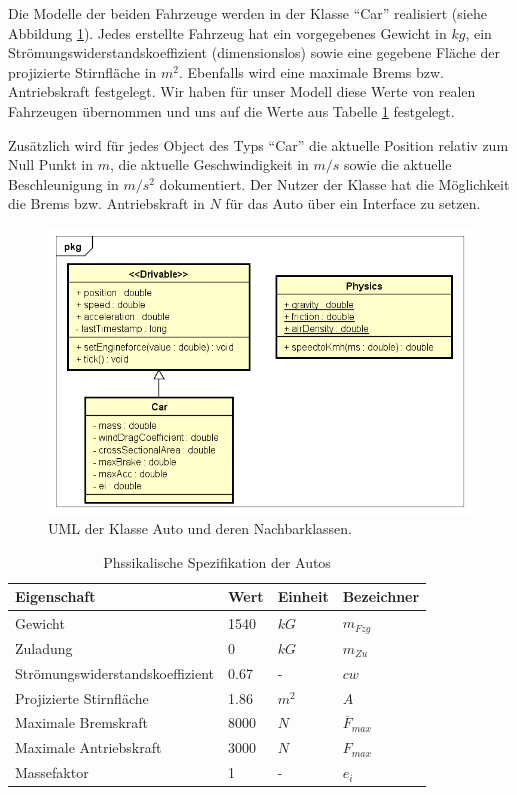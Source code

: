 \documentclass[12pt,a4paper,bibliography=totocnumbered,listof=totocnumbered, abstracton]{scrartcl}
\theoremstyle{Umgebung}
\begin{document}
Die Modelle der beiden Fahrzeuge werden in der Klasse \enquote{Car} realisiert (siehe Abbildung \ref{fig:car}). Jedes erstellte Fahrzeug hat ein vorgegebenes Gewicht in $kg$, ein Strömungswiderstandskoeffizient (dimensionslos) sowie eine gegebene Fläche der projizierte Stirnfläche in $m^2$. Ebenfalls wird eine maximale Brems bzw. Antriebskraft festgelegt. Wir haben für unser Modell diese Werte von realen Fahrzeugen übernommen und uns auf die Werte aus Tabelle \ref{table:car} festgelegt.

Zusätzlich wird für jedes Object des Typs \enquote{Car} die aktuelle Position relativ zum Null Punkt in $m$, die aktuelle Geschwindigkeit in $m/s$ sowie  die aktuelle Beschleunigung in $m/s^2$ dokumentiert. Der Nutzer der Klasse hat die Möglichkeit die Brems bzw. Antriebskraft in $N$ für das Auto über ein Interface zu setzen.

\begin{figure}
	\centering
	\includegraphics[width=0.7\linewidth]{img/practical/car-diagram}
	\caption{UML der Klasse Auto und deren Nachbarklassen.}
	\label{fig:car}
\end{figure}

\begin{table}[]
	\centering
	\caption{Phssikalische Spezifikation der Autos}
	\label{table:car}
	\begin{tabular}{@{}llll@{}}
		\toprule
		Eigenschaft                     & Wert & Einheit & Bezeichner           \\ \midrule
		Gewicht                         & 1540 & $kG$    & $m_{Fzg}$            \\
		Zuladung                        & 0    & $kG$    & $m_{Zu}$             \\
		Strömungswiderstandskoeffizient & 0.67 & -       & $cw$                 \\
		Projizierte Stirnfläche         & 1.86 & $m^2$   & $A$                  \\
		Maximale Bremskraft             & 8000 & $N$     & $\overline{F}_{max}$ \\
		Maximale Antriebskraft          & 3000 & $N$     & $ {F}_{max} $        \\
		Massefaktor                     & 1    & -       & $ {e}_{i} $          \\ \bottomrule
	\end{tabular}
\end{table}
\end{document}
